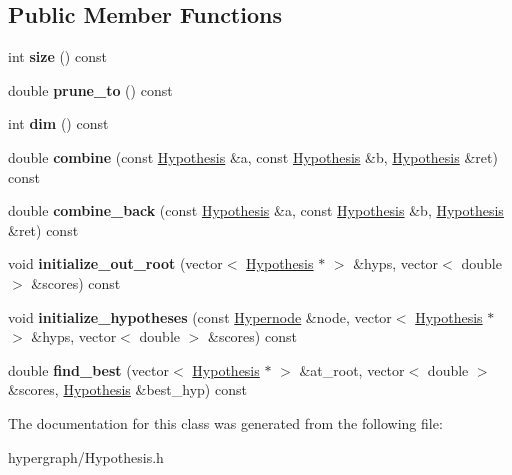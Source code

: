 \subsection*{Public Member Functions}
\begin{DoxyCompactItemize}
\item 
\hypertarget{classTrivialController_a9e8eaf941513af7da8b7a889a3f8ebb0}{
int {\bfseries size} () const }
\label{classTrivialController_a9e8eaf941513af7da8b7a889a3f8ebb0}

\item 
\hypertarget{classTrivialController_a1db69454586906695ca3f91c7a57c6b5}{
double {\bfseries prune\_\-to} () const }
\label{classTrivialController_a1db69454586906695ca3f91c7a57c6b5}

\item 
\hypertarget{classTrivialController_aec5c9aa3e7261e0b2203dfd892934459}{
int {\bfseries dim} () const }
\label{classTrivialController_aec5c9aa3e7261e0b2203dfd892934459}

\item 
\hypertarget{classTrivialController_a90b87df24a230bb3db13665aee42f172}{
double {\bfseries combine} (const \hyperlink{structHypothesis}{Hypothesis} \&a, const \hyperlink{structHypothesis}{Hypothesis} \&b, \hyperlink{structHypothesis}{Hypothesis} \&ret) const }
\label{classTrivialController_a90b87df24a230bb3db13665aee42f172}

\item 
\hypertarget{classTrivialController_a634306ab23827b2edc114a46464e1f1a}{
double {\bfseries combine\_\-back} (const \hyperlink{structHypothesis}{Hypothesis} \&a, const \hyperlink{structHypothesis}{Hypothesis} \&b, \hyperlink{structHypothesis}{Hypothesis} \&ret) const }
\label{classTrivialController_a634306ab23827b2edc114a46464e1f1a}

\item 
\hypertarget{classTrivialController_a5881688936e3b953846e0e294900d3b6}{
void {\bfseries initialize\_\-out\_\-root} (vector$<$ \hyperlink{structHypothesis}{Hypothesis} $\ast$ $>$ \&hyps, vector$<$ double $>$ \&scores) const }
\label{classTrivialController_a5881688936e3b953846e0e294900d3b6}

\item 
\hypertarget{classTrivialController_ae3d2c6dc82b49d74793e8fb5e95affd1}{
void {\bfseries initialize\_\-hypotheses} (const \hyperlink{classScarab_1_1Hypernode}{Hypernode} \&node, vector$<$ \hyperlink{structHypothesis}{Hypothesis} $\ast$ $>$ \&hyps, vector$<$ double $>$ \&scores) const }
\label{classTrivialController_ae3d2c6dc82b49d74793e8fb5e95affd1}

\item 
\hypertarget{classTrivialController_aa0ea13e2adf5aa1ceeb321b2249d815d}{
double {\bfseries find\_\-best} (vector$<$ \hyperlink{structHypothesis}{Hypothesis} $\ast$ $>$ \&at\_\-root, vector$<$ double $>$ \&scores, \hyperlink{structHypothesis}{Hypothesis} \&best\_\-hyp) const }
\label{classTrivialController_aa0ea13e2adf5aa1ceeb321b2249d815d}

\end{DoxyCompactItemize}


The documentation for this class was generated from the following file:\begin{DoxyCompactItemize}
\item 
hypergraph/Hypothesis.h\end{DoxyCompactItemize}
